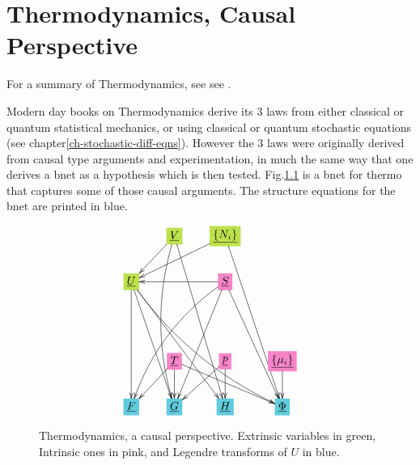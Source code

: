 \chapter{Thermodynamics, Causal Perspective}
\label{ch-thermo}

For a summary of Thermodynamics, see
see \cite{wiki-thermo}.

Modern day books on Thermodynamics
derive its 3 laws from either classical
or quantum statistical mechanics, or using classical or quantum stochastic  equations
(see chapter\ref{ch-stochastic-diff-eqns}). However
the 3 laws 
were originally derived from causal type
	arguments and experimentation, in much
	the same way that one  derives a bnet
	as a hypothesis which is then tested.
Fig.\ref{fig-texnn-for-thermo} is a bnet for thermo that
captures some of those causal arguments.
The structure equations for the bnet are printed in blue.

	


\begin{figure}[h!]\centering
	$$\xymatrix{
		&*+[F*:SpringGreen]{\underline{V}}\ar@/_1pc/[dddd]\ar[ddddr]\ar[dl]&*+[F*:SpringGreen]{\underline{\{N_i\}}}\ar[ddddr]\ar[dll]&
		\\
		*+[F*:SpringGreen]{\underline{U}}\ar@/_1pc/[dddrrr]\ar[ddd]\ar[dddr]\ar[dddrr]&&*+[F*:Lavender]{\underline{S}}\ar[dddr]\ar@/_1pc/[dddll]\ar[dddl]\ar[ll]&
		\\
		&&&
		\\
		&*+[F*:Lavender]{\underline{T}}\ar[drr]\ar[dl]\ar[d]&*+[F*:Lavender]{\underline{p}}\ar[dl]\ar[d]&*+[F*:Lavender]{\underline{\{\mu_i\}}}\ar[d]
		\\
		*+[F*:SkyBlue]{\underline{F}}&*+[F*:SkyBlue]{\underline{G}}&*+[F*:SkyBlue]{\underline{H}}&*+[F*:SkyBlue]{\underline{\Phi}}
	}$$
	\caption{Thermodynamics, a causal perspective. Extrinsic variables in green, Intrinsic ones in pink, and Legendre  transforms of $U$ in blue.}
	\label{fig-texnn-for-thermo}
\end{figure}

